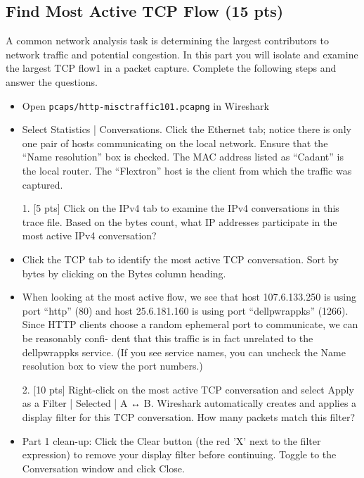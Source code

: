 \subsection {Find Most Active TCP Flow (15 pts)}
A common network analysis task is determining the largest contributors to network traffic
and potential congestion. In this part you will isolate and examine the largest TCP flow1
in
a packet capture. Complete the following steps and answer the questions.
\begin{itemize}
\item Open {\tt pcaps/http-misctraffic101.pcapng} in Wireshark
\item Select Statistics | Conversations. Click the Ethernet tab; notice there is only one
pair of hosts communicating on the local network. Ensure that the “Name resolution”
box is checked. The MAC address listed as “Cadant” is the local router. The
“Flextron” host is the client from which the traffic was captured.
\item[1.] [5 pts] Click on the IPv4 tab to examine the IPv4 conversations in this trace file. Based
on the bytes count, what IP addresses participate in the most active IPv4 conversation?
\item Click the TCP tab to identify the most active TCP conversation. Sort by bytes by
clicking on the Bytes column heading.
\item When looking at the most active flow, we see that host 107.6.133.250 is using port
“http” (80) and host 25.6.181.160 is using port “dellpwrappks” (1266). Since HTTP
clients choose a random ephemeral port to communicate, we can be reasonably confi-
dent that this traffic is in fact unrelated to the dellpwrappks service. (If you see service
names, you can uncheck the Name resolution box to view the port numbers.)
\item[2.] [10 pts] Right-click on the most active TCP conversation and select Apply as a Filter
| Selected | A ↔ B. Wireshark automatically creates and applies a display filter for
this TCP conversation. How many packets match this filter?
\item Part 1 clean-up: Click the Clear button (the red ’X’ next to the filter expression) to
remove your display filter before continuing. Toggle to the Conversation window and
click Close.
\end {itemize}
